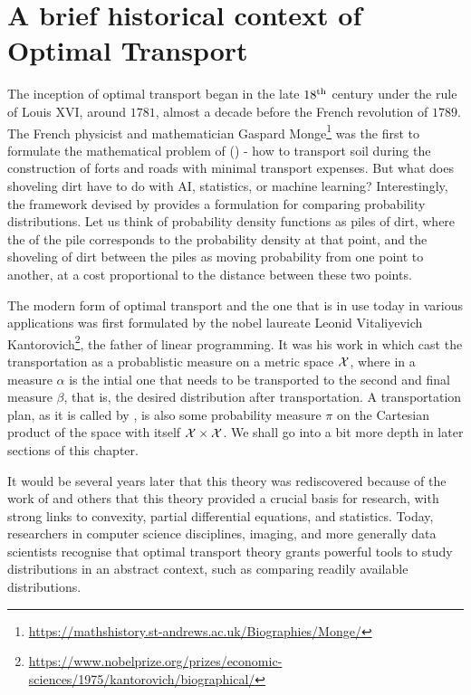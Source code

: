 \section{A brief historical context of Optimal Transport}\label{sec:ot-history}

The inception of optimal transport began in the late $18\textsuperscript{th}$ century under the rule of Louis \RN{16}, around $1781$, almost a decade before the French revolution of $1789$. The French physicist and mathematician Gaspard Monge\footnote{\url{https://mathshistory.st-andrews.ac.uk/Biographies/Monge/}} was the first to formulate the mathematical problem of  () - how to transport soil during the construction of forts and roads with minimal transport expenses. But what does shoveling dirt have to do with AI, statistics, or machine learning? Interestingly, the framework devised by \citeauthor{monge1781memoire} provides a formulation for comparing probability distributions.
Let us think of probability density functions as piles of dirt, where the  of the pile corresponds to the probability density at that point, and the shoveling of dirt between the piles as moving probability from one point to another, at a cost proportional to the distance between these two points.

The modern form of optimal transport and the one that is in use today in various applications was first formulated by the nobel laureate Leonid Vitaliyevich Kantorovich\footnote{\url{https://www.nobelprize.org/prizes/economic-sciences/1975/kantorovich/biographical/}}, the father of linear programming. 
It was his work in \citeyear{Kantorovich42} which cast the transportation as a probablistic measure on a metric space $\mathcal{X}$, where in a measure $\alpha$ is the intial one that needs to be transported to the second and final measure $\beta$, that is, the desired distribution after transportation. A transportation plan, as it is called by \citeauthor{Kantorovich42}, is also some probability measure $\pi$ on the Cartesian product of the space with itself $\mathcal{X} \times \mathcal{X}$.
We shall go into a bit more depth in later sections of this chapter.

It would be several years later that this theory was rediscovered because of the work of \textcite{Brenier1991PolarFunctions} and others that this theory provided a crucial basis for research, with strong links to convexity, partial differential equations, and statistics. Today, researchers in computer science disciplines, imaging, and more generally data scientists recognise that optimal transport theory grants powerful tools to study distributions in an abstract context, such as comparing readily available distributions.

